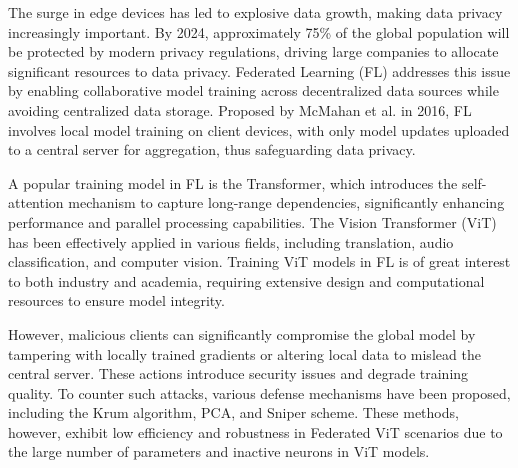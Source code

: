 \documentclass[conference]{IEEEtran}
\begin{document}


The surge in edge devices has led to explosive data growth, making data privacy increasingly important\cite{edgeComputing_explosiveGrowth}. By 2024, approximately 75\% of the global population will be protected by modern privacy regulations, driving large companies to allocate significant resources to data privacy. Federated Learning (FL) addresses this issue by enabling collaborative model training across decentralized data sources while avoiding centralized data storage\cite{useFL2solve}. Proposed by McMahan et al. in 2016, FL involves local model training on client devices, with only model updates uploaded to a central server for aggregation, thus safeguarding data privacy\cite{FLGenesisArticle}.

A popular training model in FL is the Transformer, which introduces the self-attention mechanism to capture long-range dependencies, significantly enhancing performance and parallel processing capabilities\cite{transformer}. The Vision Transformer (ViT) has been effectively applied in various fields, including translation\cite{transformer_translation}, audio classification\cite{transformer_audioClassification}, and computer vision\cite{transformer_vision}. Training ViT models in FL is of great interest to both industry and academia\cite{transformer_gotInterest}, requiring extensive design and computational resources to ensure model integrity\cite{MrZhou_IoE_MTD}.

However, malicious clients can significantly compromise the global model by tampering with locally trained gradients or altering local data to mislead the central server. These actions introduce security issues and degrade training quality. To counter such attacks, various defense mechanisms have been proposed, including the Krum algorithm\cite{aggregation_Krum}, PCA\cite{federatedPCA}, and Sniper scheme\cite{aggregation_Sniper}. These methods, however, exhibit low efficiency and robustness in Federated ViT scenarios due to the large number of parameters and inactive neurons in ViT models\cite{MrZhou_IoE_Shuffle}.
\end{document}
